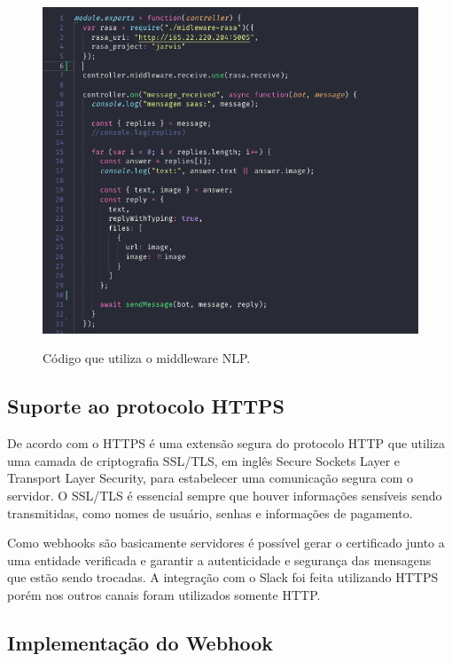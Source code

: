 \begin{figure}[H]
  \centering
   \caption{Código que utiliza o middleware NLP.}
  \includegraphics[scale=0.35]{Imagens/nlu-middleware.png} 
  \label{middleware-rasa}
  
\end{figure}


\subsection{Suporte ao protocolo HTTPS}

De acordo com  o HTTPS é uma extensão segura do protocolo HTTP que utiliza uma camada de criptografia SSL/TLS, em inglês Secure Sockets Layer e Transport Layer Security, para estabelecer uma comunicação segura com o servidor. O SSL/TLS é essencial sempre que houver informações sensíveis sendo transmitidas, como nomes de usuário, senhas e informações de pagamento. 

Como webhooks são basicamente servidores é possível gerar o certificado junto a uma entidade verificada e garantir a autenticidade e segurança das mensagens que estão sendo trocadas. A integração com o Slack foi feita utilizando HTTPS porém nos outros canais foram utilizados somente HTTP.


\subsection{Implementação do Webhook}

